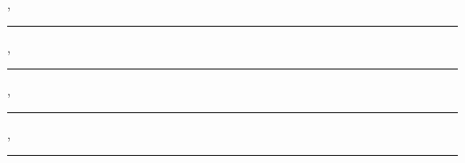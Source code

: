 { \memberiv, \memberT \\ \memberivUni \hfill\rule{5cm}{1pt} }

\else

{ \advisor, \advisorT \\ \advisorUni \hfill\rule{5cm}{1pt} }

{ \memberi, \memberT \\ \memberiUni \hfill\rule{5cm}{1pt} }

{ \memberii, \memberT \\ \memberiiUni \hfill\rule{5cm}{1pt} }

\fi
\fi


\ifnum{}
\newpage
\thispagestyle{empty}
\vspace*{\fill}

\plagirismText

\parbox{\textwidth}{
\raggedleft \normalsize \dateFull \\ \vspace{0.4cm} 

\student \ifx\studentii\empty\else{\hspace{0.5cm} \studentii } \fi
 \ifx\studentiii\empty\else{\hspace{0.5cm} \studentiii  } \fi
 \ifx\studentiv\empty\else{\hspace{0.5cm} \studentiv  } \fi
}

\vspace{2cm}
\fi







